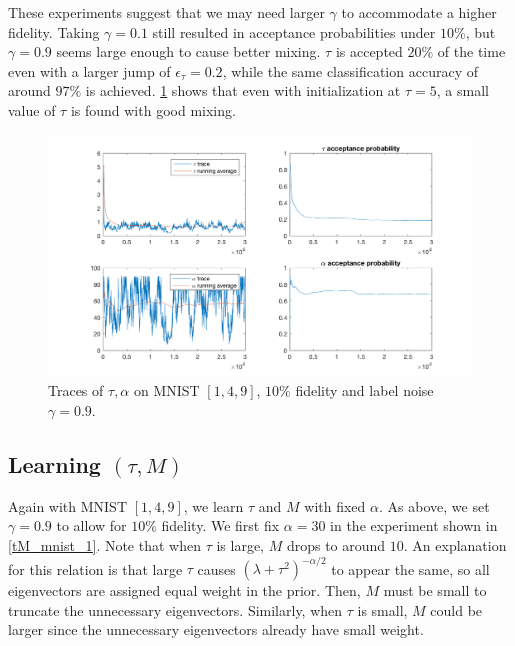 \documentclass{siamart1116}
\begin{document}
        These experiments suggest that we may need larger $\gamma$ to accommodate a higher fidelity. Taking $\gamma = 0.1$ still resulted in acceptance probabilities under $10\%$, but $\gamma = 0.9$ seems large enough to cause better mixing. $\tau$ is accepted $20\%$ of the time even with a larger jump of $\epsilon_\tau = 0.2$, while the same classification accuracy of around $97\%$ is achieved. \cref{ta_mnist_4} shows that even with initialization at $\tau=5$, a small value of $\tau$ is found with good mixing.

        \begin{figure}[!htb]
        \centering
        \caption{\label{ta_mnist_4}Traces of $\tau, \alpha$ on MNIST $[1, 4, 9]$, $10\%$ fidelity and label noise $\gamma = 0.9$.}
        \includegraphics[width=0.8\linewidth]{choose_hyp/t_a/good_tau.png}
        \end{figure}

    \subsection{Learning $(\tau, M)$}
        Again with MNIST $[1, 4, 9]$, we learn $\tau$ and $M$ with fixed $\alpha$. As above, we set $\gamma = 0.9$ to allow for $10\%$ fidelity. We first fix $\alpha=30$ in the experiment shown in \cref{tM_mnist_1}. Note that when $\tau$ is large, $M$ drops to around $10$. An explanation for this relation is that large $\tau$ causes $(\lambda + \tau^2)^{-\alpha/2}$ to appear the same, so all eigenvectors are assigned equal weight in the prior. Then, $M$ must be small to truncate the unnecessary eigenvectors. Similarly, when $\tau$ is small, $M$ could be larger since the unnecessary eigenvectors already have small weight.
\end{document}
